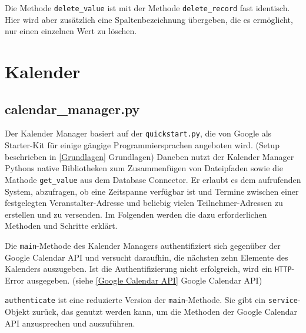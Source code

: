                 Die Methode \verb|delete_value| ist mit der Methode \verb|delete_record| fast identisch. Hier wird aber zusätzlich eine Spaltenbezeichnung übergeben, die es ermöglicht, nur einen einzelnen Wert zu löschen.


    \section{Kalender} \label{Kalender}
        
        \subsection{calendar\_manager.py} \label{calendar_manager.py}
        Der Kalender Manager basiert auf der \verb|quickstart.py|, die von Google als Starter-Kit für einige gängige Programmiersprachen angeboten wird. (Setup beschrieben in \ref{Grundlagen} Grundlagen) Daneben nutzt der Kalender Manager Pythons native Bibliotheken zum Zusammenfügen von Dateipfaden sowie die Mathode \verb|get_value| aus dem Database Connector. Er erlaubt es dem aufrufenden System, abzufragen, ob eine Zeitspanne verfügbar ist und Termine zwischen einer festgelegten Veranstalter-Adresse und beliebig vielen Teilnehmer-Adressen zu erstellen und zu versenden. Im Folgenden werden die dazu erforderlichen Methoden und Schritte erklärt. 

                Die \verb|main|-Methode des Kalender Managers authentifiziert sich gegenüber der Google Calendar API und versucht daraufhin, die nächsten zehn Elemente des Kalenders auszugeben. Ist die Authentifizierung nicht erfolgreich, wird ein \verb|HTTP|-Error ausgegeben. (siehe \ref{Google Calendar API} Google Calendar API)

                \verb|authenticate| ist eine reduzierte Version der \verb|main|-Methode. Sie gibt ein \verb|service|-Objekt zurück, das genutzt werden kann, um die Methoden der Google Calendar API anzusprechen und auszuführen. 
    
